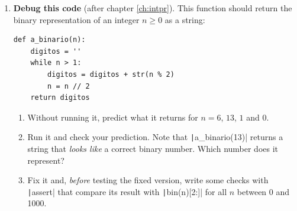 \begin{enumerate}
\begin{quote}
\emph{``To convert $0.375$ to binary we multiply it by 2 repeatedly: $0.75$ (integer part 0), $1.5$ (integer part 1) and, removing the integer part, $1.0$ (integer part 1). As with integers, we read the integer parts from bottom to top, so $0.375 = 0.110$ in binary. In general, a number with three decimal digits has at most three binary digits, so $0.1$ is also represented exactly.''}
\end{quote}
Find the two mistakes. Check your representation of $0.375$ by converting it back, and work out which number $0.110$ actually represents.

\item \label{ej:intro_depura-en} \textbf{Debug this code} (after chapter \ref{ch:intpr}). This function should return the binary representation of an integer $n\geq0$ as a string:
\begin{verbatim}
def a_binario(n):
    digitos = ''
    while n > 1:
        digitos = digitos + str(n % 2)
        n = n // 2
    return digitos
\end{verbatim}
\begin{enumerate}
\item Without running it, predict what it returns for $n=6$, $13$, $1$ and $0$.
\item Run it and check your prediction. Note that \texttt|a_binario(13)| returns a string that \emph{looks like} a correct binary number. Which number does it represent?
\item Fix it and, \emph{before} testing the fixed version, write some checks with \texttt|assert| that compare its result with \texttt|bin(n)[2:]| for all $n$ between 0 and 1000.
\end{enumerate}
\end{enumerate}

\fussy
